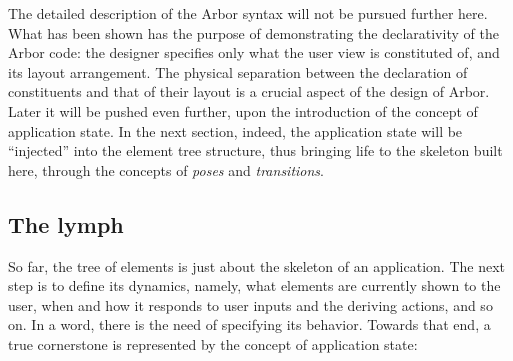 \documentclass[12pt]{article} %
\newcommand{\A}{Arbor}
\newcommand{\q}[1]{``#1''}
\begin{document}
The detailed description of the \A{} syntax will not be pursued further here. What has been shown has the purpose of demonstrating the declarativity of the \A{} code: the designer specifies only what the user view is constituted of, and its layout arrangement. The physical separation between the declaration of constituents and that of their layout is a crucial aspect of the design of \A{}. Later it will be pushed even further, upon the introduction of the concept of application state. In the next section, indeed, the application state will be \q{injected} into the element tree structure, thus bringing life to the skeleton built here, through the concepts of \emph{poses} and \emph{transitions}.\\


\subsection{The lymph}\label{lymph}
So far, the tree of elements is just about the skeleton of an application. The next step is to define its dynamics, namely, what elements are currently shown to the user, when and how it responds to user inputs and the deriving actions, and so on. In a word, there is the need of specifying its behavior. Towards that end, a true cornerstone is represented by the concept of application state:\\
\end{document}
